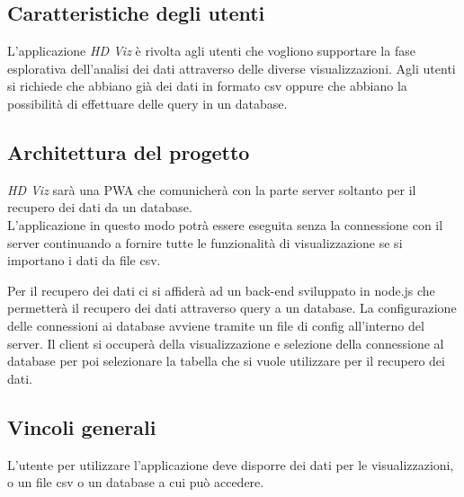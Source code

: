 \subsection{Caratteristiche degli utenti}
L'applicazione \emph{HD Viz} è rivolta agli utenti che vogliono supportare la fase esplorativa dell'analisi dei dati attraverso delle diverse visualizzazioni. Agli utenti si richiede che abbiano già dei dati in formato csv oppure che abbiano la possibilità di effettuare delle query in un database.


\subsection{Architettura del progetto}
\emph{HD Viz} sarà una PWA che comunicherà con la parte server soltanto per il recupero dei dati da un database.
\\
L'applicazione in questo modo potrà essere eseguita senza la connessione con il server continuando a fornire tutte le funzionalità di visualizzazione se si importano i dati da file csv.

Per il recupero dei dati ci si affiderà ad un back-end sviluppato in node.js che permetterà il recupero dei dati attraverso query a un database. La configurazione delle connessioni ai database avviene tramite un file di config all'interno del server. Il client si occuperà della visualizzazione e selezione della connessione al database per poi selezionare la tabella che si vuole utilizzare per il recupero dei dati.

\subsection{Vincoli generali}
L'utente per utilizzare l'applicazione deve disporre dei dati per le visualizzazioni, o un file csv o un database a cui può accedere.
